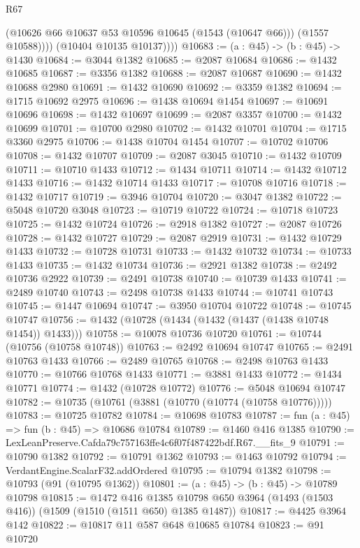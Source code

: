 \begin{lexlean}{R67}
\begin{coremodule}
                (@10626 @66 @10637 @53 @10596 @10645 (@1543 (@10647 @66)))
                (@1557 @10588))))
          (@10404 @10135 @10137))))
@10683 := (a : @45) -> (b : @45) -> @1430
@10684 := @3044 @1382
@10685 := @2087 @10684
@10686 := @1432 @10685
@10687 := @3356 @1382
@10688 := @2087 @10687
@10690 := @1432 @10688 @2980
@10691 := @1432 @10690
@10692 := @3359 @1382
@10694 := @1715 @10692 @2975
@10696 := @1438 @10694 @1454
@10697 := @10691 @10696
@10698 := @1432 @10697
@10699 := @2087 @3357
@10700 := @1432 @10699
@10701 := @10700 @2980
@10702 := @1432 @10701
@10704 := @1715 @3360 @2975
@10706 := @1438 @10704 @1454
@10707 := @10702 @10706
@10708 := @1432 @10707
@10709 := @2087 @3045
@10710 := @1432 @10709
@10711 := @10710 @1433
@10712 := @1434 @10711
@10714 := @1432 @10712 @1433
@10716 := @1432 @10714 @1433
@10717 := @10708 @10716
@10718 := @1432 @10717
@10719 := @3946 @10704
@10720 := @3047 @1382
@10722 := @5048 @10720 @3048
@10723 := @10719 @10722
@10724 := @10718 @10723
@10725 := @1432 @10724
@10726 := @2918 @1382
@10727 := @2087 @10726
@10728 := @1432 @10727
@10729 := @2087 @2919
@10731 := @1432 @10729 @1433
@10732 := @10728 @10731
@10733 := @1432 @10732
@10734 := @10733 @1433
@10735 := @1432 @10734
@10736 := @2921 @1382
@10738 := @2492 @10736 @2922
@10739 := @2491 @10738
@10740 := @10739 @1433
@10741 := @2489 @10740
@10743 := @2498 @10738 @1433
@10744 := @10741 @10743
@10745 := @1447 @10694
@10747 := @3950 @10704 @10722
@10748 := @10745 @10747
@10756 := @1432 (@10728 (@1434 (@1432 (@1437 (@1438 @10748 @1454)) @1433)))
@10758 := @10078 @10736 @10720
@10761 := @10744 (@10756 (@10758 @10748))
@10763 := @2492 @10694 @10747
@10765 := @2491 @10763 @1433
@10766 := @2489 @10765
@10768 := @2498 @10763 @1433
@10770 := @10766 @10768 @1433
@10771 := @3881 @1433
@10772 := @1434 @10771
@10774 := @1432 (@10728 @10772)
@10776 := @5048 @10694 @10747
@10782 := @10735 (@10761 (@3881 (@10770 (@10774 (@10758 @10776)))))
@10783 := @10725 @10782
@10784 := @10698 @10783
@10787 := fun (a : @45) => fun (b : @45) => @10686 @10784
@10789 := @1460 @416 @1385
@10790 := LexLeanPreserve.Cafda79c757163ffe4c6f07f487422bdf.R67.__fits_9
@10791 := @10790 @1382
@10792 := @10791 @1362
@10793 := @1463 @10792
@10794 := VerdantEngine.ScalarF32.addOrdered
@10795 := @10794 @1382
@10798 := @10793 (@91 (@10795 @1362))
@10801 := (a : @45) -> (b : @45) -> @10789 @10798
@10815 := @1472
    @416
    @1385
    @10798
    @650
    @3964
    (@1493 (@1503 @416))
    (@1509 (@1510 (@1511 @650) @1385 @1487))
@10817 := @4425 @3964 @142
@10822 := @10817 @11 @587 @648 @10685 @10784
@10823 := @91 @10720

\end{coremodule}
\end{lexlean}
